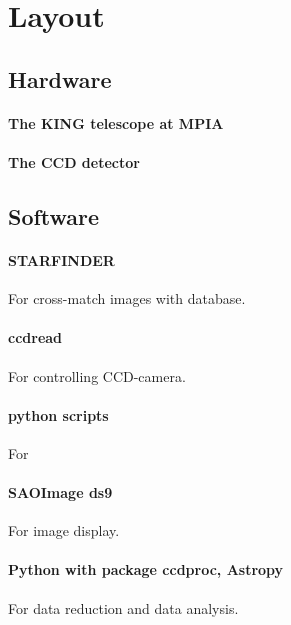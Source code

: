 \section{Layout}
\subsection{Hardware}
\paragraph{The KING telescope at MPIA}
\paragraph{The CCD detector}

\subsection{Software}
\paragraph{STARFINDER}
For cross-match images with database.
\paragraph{ccdread}
For controlling CCD-camera. 
\paragraph{python scripts}
For 
\paragraph{SAOImage ds9}
For image display.
\paragraph{Python with package ccdproc, Astropy}
For data reduction and data analysis.